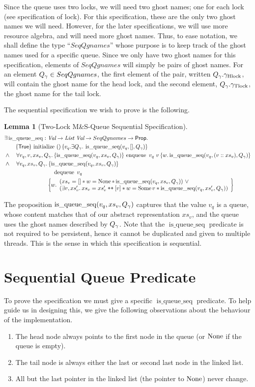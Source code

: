 \documentclass[a4paper, 10pt]{report}
\theoremstyle{definition}
\newtheorem{lemma}[theorem]{Lemma}
\newcommand{\initialise}{\operatorname{initialize}}
\newcommand{\enqueue}{\operatorname{enqueue}}
\newcommand{\dequeue}{\operatorname{dequeue}}
\newcommand{\msq}{M\&S-Queue\xspace}
\newcommand{\tlmsq}{Two-Lock \msq}
\newcommand{\isqueueseq}{\operatorname{is\_queue\_seq}}
\newcommand{\SeqQgnames}{SeqQgnames}
\newcommand{\vq}{v_q}
\newcommand{\nodeval}{\valB}
\newcommand{\absvalue}{\val}
\newcommand{\absvalueList}{xs_v}
\newcommand{\Qg}{Q_\gname}
\newcommand{\ghlock}{\gname_{\mathrm{Hlock}}}
\newcommand{\gtlock}{\gname_{\mathrm{Tlock}}}
\newcommand\catenate{\mathbin{\text{\ttfamily\upshape ++}}}
\newcommand{\tlseqspecinit}{\hoare{\TRUE}{\initialise \ \TT}{\vq . \Exists \Qg. \isqueueseq(\vq, [], \Qg)}}
\newcommand{\tlseqspecenq}{\All \vq, \absvalue, \absvalueList, \Qg. \hoare{\isqueueseq(\vq, \absvalueList, \Qg)}{\enqueue \ \vq \ \absvalue}{\valB . \isqueueseq(\vq, (\absvalue :: \absvalueList), \Qg)}}
\newcommand{\tlseqspecdeq}{\All \vq, \absvalueList, \Qg. \hoareV[t]{\isqueueseq(\vq, \absvalueList, \Qg)}{\dequeue \ \vq}{\nodeval . \begin{array}{l}(\absvalueList = [] \star \nodeval = \None \star \isqueueseq(\vq, \absvalueList, \Qg)) ~ \lor\\ (\Exists \absvalue, \absvalueList' . \absvalueList = \absvalueList' \catenate [\absvalue] \star \nodeval = \Some \absvalue \star \isqueueseq(\vq, \absvalueList', \Qg)) \end{array}}}
\begin{document}
Since the queue uses two locks, we will need two ghost names; one for each lock (see specification of lock). For this specification, these are the only two ghost names we will need. However, for the later specifications, we will use more resource algebra, and will need more ghost names. Thus, to ease notation, we shall define the type ``$\SeqQgnames$'' whose purpose is to keep track of the ghost names used for a specific queue. Since we only have two ghost names for this specification, elements of $\SeqQgnames$ will simply be pairs of ghost names. For an element $\Qg \in \SeqQgnames$, the first element of the pair, written $\Qg.\ghlock$, will contain the ghost name for the head lock, and the second element, $\Qg.\gtlock$, the ghost name for the tail lock.

The sequential specification we wish to prove is the following.
\begin{lemma}[\tlmsq Sequential Specification]\label{TLMSQ:spec:seq}
\begin{align*}
  &\Exists \isqueueseq : \Val \to \List ~ \Val \to \SeqQgnames \to \Prop.\\
  &\quad\quad\tlseqspecinit\\
  &\land\quad\tlseqspecenq\\
  &\land\quad\tlseqspecdeq
\end{align*}
\end{lemma}

The proposition $\isqueueseq(\vq, \absvalueList, \Qg)$ captures that the value $\vq$ is a queue, whose content matches that of our abstract representation $\absvalueList$, and the queue uses the ghost names described by $\Qg$. Note that the $\isqueueseq$ predicate is not required to be persistent, hence it cannot be duplicated and given to multiple threads. This is the sense in which this specification is sequential.

\section{Sequential Queue Predicate}
\label{TLMSQSEQ:section:seq-queue-pred}

To prove the specification we must give a specific $\isqueueseq$ predicate. To help guide us in designing this, we give the following observations about the behaviour of the implementation.
\begin{enumerate}
  \item\label{TLMSQ:insights:head} The head node always points to the first node in the queue (or $\operatorname{None}$ if the queue is empty).
  \item\label{TLMSQ:insights:tail} The tail node is always either the last or second last node in the linked list.
  \item\label{TLMSQ:insights:persistent} All but the last pointer in the linked list (the pointer to $\operatorname{None}$) never change.
\end{enumerate}
\end{document}
